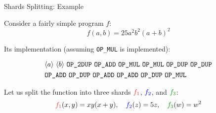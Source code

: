 \documentclass{zkdl-presentation-template}
\newcommand{\elem}[1]{\, \langle #1 \rangle \,}
\newcommand{\opcode}[1]{\, \texttt{#1} \,}
\begin{document}
    \begin{frame}{Shards Splitting: Example}
    \begin{example}
        Consider a fairly simple program $f$:
  \begin{equation*}
      f(a,b) = 25a^2b^2(a+b)^2
  \end{equation*}

    Its implementation (assuming \texttt{OP\_MUL} is implemented):
    
  \begin{empheqboxed}
    \small
    \begin{align*}
        &\elem{a} \elem{b} \opcode{\texttt{OP\_2DUP}} \opcode{\texttt{OP\_ADD}} \opcode{\texttt{OP\_MUL}} \opcode{\texttt{OP\_MUL}} 
        \opcode{\texttt{OP\_DUP}} \opcode{\texttt{OP\_DUP}} \\& \opcode{\texttt{OP\_ADD}} \opcode{\texttt{OP\_DUP}} \opcode{\texttt{OP\_ADD}} \opcode{\texttt{OP\_ADD}} \opcode{\texttt{OP\_DUP}} \opcode{\texttt{OP\_MUL}}
    \end{align*}
  \end{empheqboxed}

  Let us split the function into three shards $\textcolor{red!80!white}{f_1}$, $\textcolor{blue}{f_2}$, and $\textcolor{green!60!black}{f_3}$:
  \begin{align*}
      \textcolor{red!80!white}{f_1}(x,y) = xy(x+y), \quad \textcolor{blue}{f_2}(z) = 5z, \quad \textcolor{green!60!black}{f_3}(w) = w^2
  \end{align*}
  \end{example}
  \end{frame}
  
\end{document}
